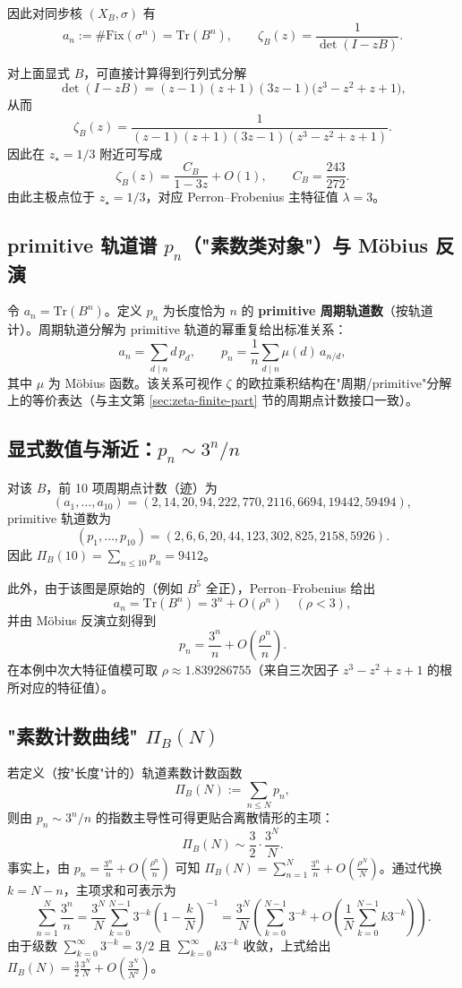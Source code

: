 因此对同步核 $(X_B,\sigma)$ 有
\[
a_n:=\#\mathrm{Fix}(\sigma^n)=\mathrm{Tr}(B^n),\qquad
\zeta_B(z)=\frac{1}{\det(I-zB)}.
\]

对上面显式 $B$，可直接计算得到行列式分解
\[
\det(I-zB)=(z-1)(z+1)(3z-1)\bigl(z^3-z^2+z+1\bigr),
\]
从而
\[
\zeta_B(z)=\frac{1}{(z-1)(z+1)(3z-1)(z^3-z^2+z+1)}.
\]
因此在 $z_\star=1/3$ 附近可写成
\[
\zeta_B(z)=\frac{C_B}{1-3z}+O(1),
\qquad
C_B=\frac{243}{272}.
\]
由此主极点位于 $z_\star=1/3$，对应 Perron--Frobenius 主特征值 $\lambda=3$。

\subsection{primitive 轨道谱 \texorpdfstring{$p_n$}{p\_n}（"素数类对象"）与 Möbius 反演}
令 $a_n=\mathrm{Tr}(B^n)$。定义 $p_n$ 为长度恰为 $n$ 的 \textbf{primitive 周期轨道数}（按轨道计）。周期轨道分解为 primitive 轨道的幂重复给出标准关系：
\[
a_n=\sum_{d\mid n} d\,p_d,
\qquad
p_n=\frac{1}{n}\sum_{d\mid n}\mu(d)\,a_{n/d},
\]
其中 $\mu$ 为 Möbius 函数。该关系可视作 $\zeta$ 的欧拉乘积结构在"周期/primitive"分解上的等价表达（与主文第 \ref{sec:zeta-finite-part} 节的周期点计数接口一致）。

\subsection{显式数值与渐近：\texorpdfstring{$p_n\sim 3^n/n$}{p\_n ~ 3**n/n}}
对该 $B$，前 10 项周期点计数（迹）为
\[
(a_1,\dots,a_{10})=(2,14,20,94,222,770,2116,6694,19442,59494),
\]
primitive 轨道数为
\[
(p_1,\dots,p_{10})=(2,6,6,20,44,123,302,825,2158,5926).
\]
因此 $\Pi_B(10)=\sum_{n\le 10}p_n=9412$。

此外，由于该图是原始的（例如 $B^5$ 全正），Perron--Frobenius 给出
\[
a_n=\mathrm{Tr}(B^n)=3^n+O(\rho^n)
\quad(\rho<3),
\]
并由 Möbius 反演立刻得到
\[
p_n=\frac{3^n}{n}+O\!\left(\frac{\rho^n}{n}\right).
\]
在本例中次大特征值模可取 $\rho\approx 1.839286755$（来自三次因子 $z^3-z^2+z+1$ 的根所对应的特征值）。

\subsection{"素数计数曲线" \texorpdfstring{$\Pi_B(N)$}{Pi\_B(N)}}
若定义（按"长度"计的）轨道素数计数函数
\[
\Pi_B(N):=\sum_{n\le N}p_n,
\]
则由 $p_n\sim 3^n/n$ 的指数主导性可得更贴合离散情形的主项：
\[
\Pi_B(N)\sim \frac{3}{2}\cdot \frac{3^N}{N}.
\]
事实上，由 $p_n = \frac{3^n}{n} + O(\frac{\rho^n}{n})$ 可知 $\Pi_B(N) = \sum_{n=1}^N \frac{3^n}{n} + O(\frac{\rho^N}{N})$。通过代换 $k = N - n$，主项求和可表示为
\[
\sum_{n=1}^N \frac{3^n}{n} = \frac{3^N}{N} \sum_{k=0}^{N-1} 3^{-k} \left( 1 - \frac{k}{N} \right)^{-1} = \frac{3^N}{N} \left( \sum_{k=0}^{N-1} 3^{-k} + O\left(\frac{1}{N}\sum_{k=0}^{N-1} k 3^{-k}\right) \right).
\]
由于级数 $\sum_{k=0}^\infty 3^{-k} = 3/2$ 且 $\sum_{k=0}^\infty k 3^{-k}$ 收敛，上式给出 $\Pi_B(N) = \frac{3}{2} \frac{3^N}{N} + O\left(\frac{3^N}{N^2}\right)$。

